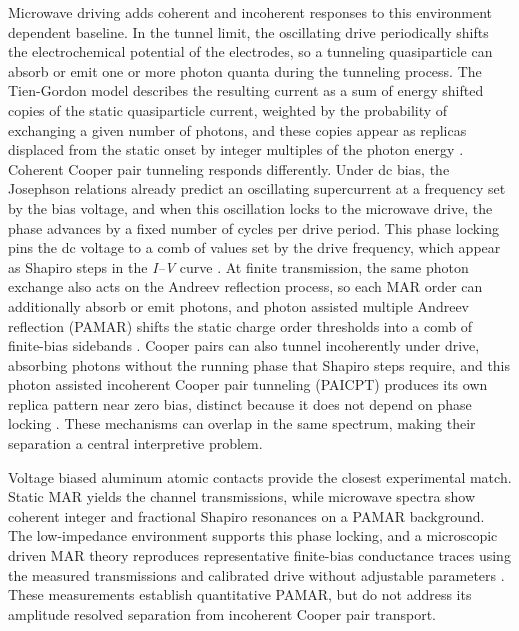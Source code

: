     Microwave driving adds coherent and incoherent responses to this environment dependent baseline. In the tunnel limit, the oscillating drive periodically shifts the electrochemical potential of the electrodes, so a tunneling quasiparticle can absorb or emit one or more photon quanta during the tunneling process. The Tien-Gordon model describes the resulting current as a sum of energy shifted copies of the static quasiparticle current, weighted by the probability of exchanging a given number of photons, and these copies appear as replicas displaced from the static onset by integer multiples of the photon energy \cite{tien_multiphoton_1963}. Coherent Cooper pair tunneling responds differently. Under dc bias, the Josephson relations already predict an oscillating supercurrent at a frequency set by the bias voltage, and when this oscillation locks to the microwave drive, the phase advances by a fixed number of cycles per drive period. This phase locking pins the dc voltage to a comb of values set by the drive frequency, which appear as Shapiro steps in the \textit{I--V} curve \cite{shapiro_josephson_1963}. At finite transmission, the same photon exchange also acts on the Andreev reflection process, so each MAR order can additionally absorb or emit photons, and photon assisted multiple Andreev reflection (PAMAR) shifts the static charge order thresholds into a comb of finite-bias sidebands \cite{cuevas_subharmonic_2002}. Cooper pairs can also tunnel incoherently under drive, absorbing photons without the running phase that Shapiro steps require, and this photon assisted incoherent Cooper pair tunneling (PAICPT) produces its own replica pattern near zero bias, distinct because it does not depend on phase locking \cite{roychowdhury_microwave_2015}. These mechanisms can overlap in the same spectrum, making their separation a central interpretive problem.

    Voltage biased aluminum atomic contacts provide the closest experimental match. Static MAR yields the channel transmissions, while microwave spectra show coherent integer and fractional Shapiro resonances on a PAMAR background. The low-impedance environment supports this phase locking, and a microscopic driven MAR theory reproduces representative finite-bias conductance traces using the measured transmissions and calibrated drive without adjustable parameters \cite{chauvin_superconducting_2006}. These measurements establish quantitative PAMAR, but do not address its amplitude resolved separation from incoherent Cooper pair transport.

